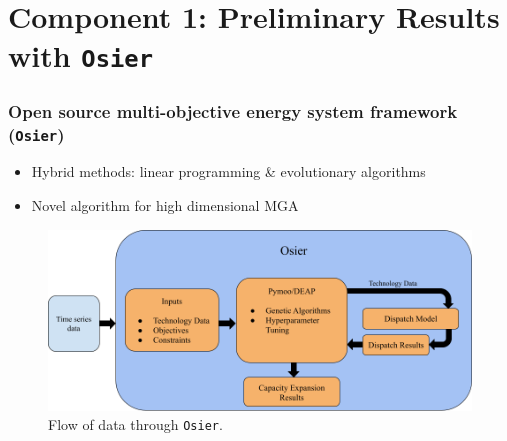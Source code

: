 

\section{Component 1: Preliminary Results with \texttt{Osier}}
\begin{frame}
    \frametitle{Open source multi-objective energy system framework (\texttt{Osier})}
    \begin{itemize}
        \item Hybrid methods: linear programming \& evolutionary algorithms
        \item Novel algorithm for high dimensional MGA
    \end{itemize}
    \begin{figure}
        \centering
        \includegraphics[width=\columnwidth]{../docs/figures/osier_flow.png}
        \caption{Flow of data through \texttt{Osier}.}
        \label{fig:osier-flow}
    \end{figure}

\end{frame}

